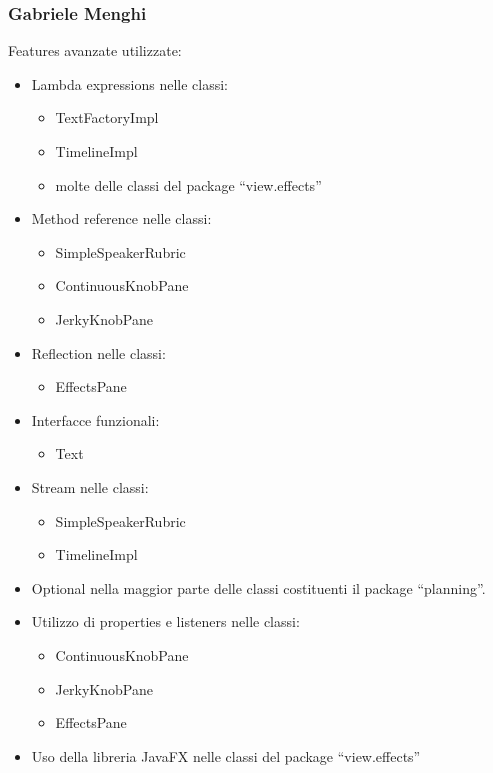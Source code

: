 \documentclass[a4paper,12pt]{report}
\begin{document}
\subsubsection{Gabriele Menghi}
Features avanzate utilizzate:
\begin{itemize}
    \item Lambda expressions nelle classi:
    \begin{itemize}
        \item TextFactoryImpl
        \item TimelineImpl
        \item molte delle classi del package “view.effects”
    \end{itemize}
    \item Method reference nelle classi:
    \begin{itemize}
        \item SimpleSpeakerRubric
        \item ContinuousKnobPane
        \item JerkyKnobPane
    \end{itemize}   
    \item Reflection nelle classi:
    \begin{itemize}
        \item EffectsPane
    \end{itemize}
    \item Interfacce funzionali:
    \begin{itemize}
        \item Text
    \end{itemize}
    \item Stream nelle classi:
    \begin{itemize}
        \item SimpleSpeakerRubric
        \item TimelineImpl
    \end{itemize}
    \item Optional nella maggior parte delle classi costituenti il package “planning”.
    \item Utilizzo di properties e listeners nelle classi:
    \begin{itemize}
        \item ContinuousKnobPane
        \item JerkyKnobPane
        \item EffectsPane
    \end{itemize}
    \item Uso della libreria JavaFX nelle classi del package “view.effects”
\end{itemize}
\end{document}

